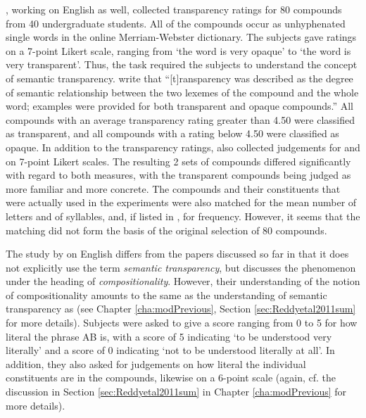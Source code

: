 

\citet{WongandRotello:2010}, working on English as well,  collected transparency ratings for 80
compounds from 40 undergraduate students. 
All of the compounds occur as unhyphenated single words in the
online Merriam-Webster dictionary. The subjects gave ratings on a 7-point Likert scale, ranging from `the word
is very opaque' to `the word is very transparent'. Thus, the task
required the subjects to understand the concept of semantic
transparency. \citet[48]{WongandRotello:2010} write that
``[t]ransparency was described as the degree of semantic relationship
between the two lexemes of the compound and the whole word; examples
were provided for both transparent and opaque compounds.'' All
compounds with an average transparency rating greater than 4.50 were
classified as transparent, and all compounds with a rating below 4.50 were
classified as opaque. In addition to the transparency ratings,
\citet{WongandRotello:2010} also collected judgements for 
and  on 7-point Likert scales. 
The resulting 2 sets of
compounds differed significantly with regard to both measures, with
the transparent compounds being judged as more familiar and more
concrete.
The compounds and their constituents that were actually used in the experiments were also
matched for the mean number of letters and of syllables, and, if listed
in \citet{KuceraandFrancis:1967}, for frequency. However, it seems that the
matching did not form the basis of the original selection of 80
compounds. 

The study by \citet{Reddyetal:2011} on English differs from the papers discussed
so far in that it does not explicitly use the term \emph{semantic
transparency}, but discusses the phenomenon under the heading of
\emph{compositionality}. 
However, their understanding
of the notion of compositionality amounts to the same as the
understanding of semantic transparency as 
(see Chapter \ref{cha:modPrevious}, Section \ref{sec:Reddyetal2011sum} for more details).   
Subjects were asked to give
a score ranging from 0 to 5 for how literal the phrase AB is, with a
score of 5 indicating `to be understood very literally' and a score
of 0 indicating `not to be understood literally at all'. In addition,
they also asked for judgements on how literal the individual
constituents are in the compounds, likewise on a 6-point scale (again,
cf. the discussion in Section \ref{sec:Reddyetal2011sum} in Chapter
\ref{cha:modPrevious} for more details).


